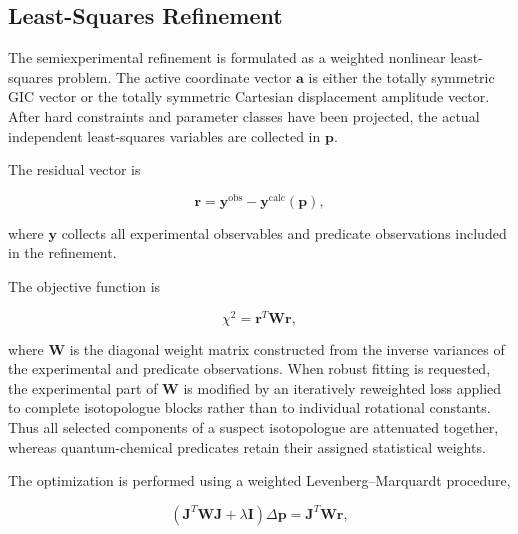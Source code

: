 \documentclass[journal=jctcce,manuscript=article,maxauthors=999]{achemso}
\begin{document}
\subsection{Least-Squares Refinement}

The semiexperimental refinement is formulated as a weighted nonlinear
least-squares problem. The active coordinate vector $\mathbf{a}$ is either the
totally symmetric GIC vector or the totally symmetric Cartesian displacement
amplitude vector. After hard constraints and parameter classes have been
projected, the actual independent least-squares variables are collected in
$\mathbf{p}$.

The residual vector is

\begin{equation}
\mathbf{r}
= \mathbf{y}^{\mathrm{obs}}
- \mathbf{y}^{\mathrm{calc}}(\mathbf{p}),
\end{equation}

where $\mathbf{y}$ collects all experimental observables and predicate
observations included in the refinement.

The objective function is

\begin{equation}
\chi^2
=
\mathbf{r}^{T}
\mathbf{W}
\mathbf{r},
\end{equation}

where $\mathbf{W}$ is the diagonal weight matrix constructed from the inverse
variances of the experimental and predicate observations.
When robust fitting is requested, the experimental part of $\mathbf{W}$ is
modified by an iteratively reweighted loss applied to complete isotopologue
blocks rather than to individual rotational constants. Thus all selected
components of a suspect isotopologue are attenuated together, whereas
quantum-chemical predicates retain their assigned statistical weights.

The optimization is performed using a weighted Levenberg--Marquardt procedure,

\begin{equation}
\left(
\mathbf{J}^{T}
\mathbf{W}
\mathbf{J}
+
\lambda \mathbf{I}
\right)
\Delta \mathbf{p}
=
\mathbf{J}^{T}
\mathbf{W}
\mathbf{r},
\label{eq:lm-step}
\end{equation}
\end{document}
